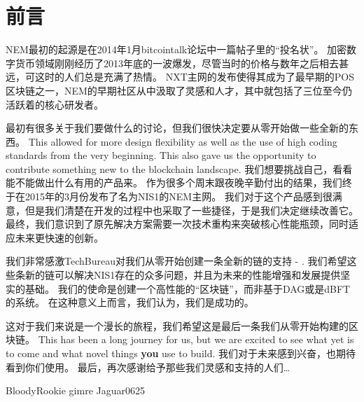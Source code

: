 \section*{前言}


NEM最初的起源是在2014年1月bitcointalk论坛中一篇帖子里的“投名状”。
加密数字货币领域刚刚经历了2013年底的一波爆发，尽管当时的价格与数年之后相去甚远，可这时的人们总是充满了热情。
NXT主网的发布使得其成为了最早期的POS区块链之一，NEM的早期社区从中汲取了灵感和人才，其中就包括了三位至今仍活跃着的核心研发者。

最初有很多关于我们要做什么的讨论，但我们很快决定要从零开始做一些全新的东西。
This allowed for more design flexibility as well as the use of high coding standards from the very beginning.
This also gave us the opportunity to contribute something new to the blockchain landscape.
我们想要挑战自己，看看能不能做出什么有用的产品来。
作为很多个周末跟夜晚辛勤付出的结果，我们终于在2015年的3月份发布了名为NIS1的NEM主网。
我们对于这个产品感到很满意，但是我们清楚在开发的过程中也采取了一些捷径，于是我们决定继续改善它。
最终，我们意识到了原先解决方案需要一次技术重构来突破核心性能瓶颈，同时适应未来更快速的创新。

我们非常感激TechBureau对我们从零开始创建一条全新的链的支持 - \codename.
我们希望这些条新的链可以解决NIS1存在的众多问题，并且为未来的性能增强和发展提供坚实的基础。
我们的使命是创建一个高性能的“区块链”，而非基于DAG或是dBFT的系统。
在这种意义上而言，我们认为，我们是成功的。

这对于我们来说是一个漫长的旅程，我们希望这是最后一条我们从零开始构建的区块链。
This has been a long journey for us, but we are excited to see what yet is to come and what novel things \textbf{you} use \codenamespace to build.
我们对于未来感到兴奋，也期待看到你们使用。
最后，再次感谢给予那些我们灵感和支持的人们\ldots

\begin{flushright}
BloodyRookie
gimre
Jaguar0625
\end{flushright}
